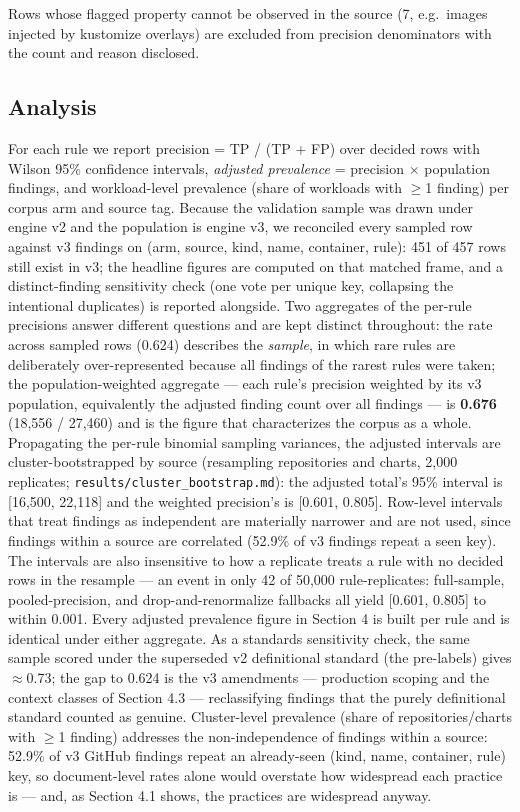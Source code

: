 \documentclass[pdflatex,sn-basic]{sn-jnl}
\begin{document}
Rows whose flagged property
cannot be observed in the source (7, e.g.~images injected by kustomize
overlays) are excluded from precision denominators with the count and
reason disclosed.

\hypertarget{analysis}{%
\subsection{Analysis}\label{analysis}}

For each rule we report precision = TP / (TP + FP) over decided rows
with Wilson 95\% confidence intervals, \emph{adjusted prevalence} =
precision $\times$ population findings, and workload-level prevalence (share of
workloads with $\geq$1 finding) per corpus arm and source tag. Because the
validation sample was drawn under engine v2 and the population is engine
v3, we reconciled every sampled row against v3 findings on (arm, source,
kind, name, container, rule): 451 of 457 rows still exist in v3; the
headline figures are computed on that matched frame, and a
distinct-finding sensitivity check (one vote per unique key, collapsing
the intentional duplicates) is reported alongside. Two aggregates of the
per-rule precisions answer different questions and are kept distinct
throughout: the rate across sampled rows (0.624) describes the
\emph{sample}, in which rare rules are deliberately over-represented
because all findings of the rarest rules were taken; the
population-weighted aggregate --- each rule's precision weighted by its
v3 population, equivalently the adjusted finding count over all findings
--- is \textbf{0.676} (18,556 / 27,460) and is the figure that
characterizes the corpus as a whole. Propagating the per-rule binomial
sampling variances, the adjusted intervals are cluster-bootstrapped by
source (resampling repositories and charts, 2,000 replicates;
\texttt{results/cluster\_bootstrap.md}): the adjusted total's 95\%
interval is {[}16,500, 22,118{]} and the weighted precision's is {[}0.601, 0.805{]}. Row-level intervals that treat findings as
independent are materially narrower and are not used, since findings
within a source are correlated (52.9\% of v3 findings repeat a seen
key). The intervals are also insensitive to how a replicate treats a
rule with no decided rows in the resample --- an event in only 42 of
50,000 rule-replicates: full-sample, pooled-precision, and
drop-and-renormalize fallbacks all yield {[}0.601, 0.805{]} to within 0.001. Every
adjusted prevalence figure in Section 4 is built per rule and is
identical under either aggregate. As a standards sensitivity check, the
same sample scored under the superseded v2 definitional standard (the
pre-labels) gives $\approx$0.73; the gap to 0.624 is the v3 amendments ---
production scoping and the context classes of Section 4.3 ---
reclassifying findings that the purely definitional standard counted as
genuine. Cluster-level prevalence (share of repositories/charts with $\geq$1
finding) addresses the non-independence of findings within a source:
52.9\% of v3 GitHub findings repeat an already-seen (kind, name,
container, rule) key, so document-level rates alone would overstate how
widespread each practice is --- and, as Section 4.1 shows, the practices
are widespread anyway.
\end{document}

